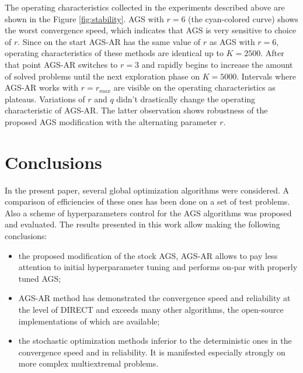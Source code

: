 \documentclass[runningheads]{llncs}
\begin{document}
The operating characteristics collected in the experiments described above are shown in the Figure \ref{fig:stability}.
AGS with $r=6$ (the cyan-colored curve) shows the worst convergence speed, which indicates that AGS is very sensitive to choice of $r$.
Since on the start AGS-AR has the same value of $r$ as AGS with $r=6$, operating characteristics of these methods
are identical up to $K=2500$. After that point AGS-AR switches to $r=3$ and rapidly begins to increase the amount of solved problems
until the next exploration phase on $K=5000$. Intervals where AGS-AR works with $r=r_{max}$ are visible on the operating characteristics as plateaus.
Variations of $r$ and $q$ didn't drastically change the operating characteristic of AGS-AR. The latter observation shows robustness of the proposed
AGS modification with the alternating parameter $r$.

\section{Conclusions}

In the present paper, several global optimization algorithms were considered.
A comparison of efficiencies of these ones has been done on a set of test problems.
Also a scheme of hyperparameters control for the AGS algorithms was proposed and evaluated.
The results presented in this work allow making the following conclusions:
\begin{itemize}
  \item the proposed modification of the stock AGS, AGS-AR allows to pay less attention to initial hyperparameter tuning and
  performs on-par with properly tuned AGS;
  \item AGS-AR method has demonstrated the convergence
  speed and reliability at the level of DIRECT and exceeds many other algorithms, the open-source
  implementations of which are available;
  \item the stochastic optimization methods inferior to the deterministic ones in the convergence
speed and in reliability. It is manifested especially strongly on more complex multiextremal
problems.
\end{itemize}

%

{}
%
\end{document}
